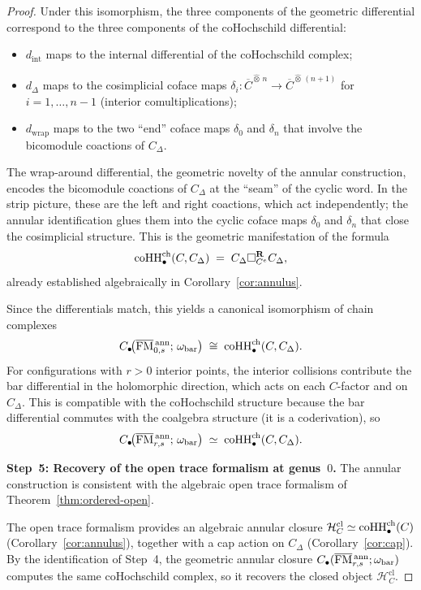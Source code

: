 \begin{proof}
Under this isomorphism, the three components of the geometric
differential correspond to the three components of the coHochschild
differential:
\begin{itemize}
\item $d_{\mathrm{int}}$ maps to the internal differential of
 the coHochschild complex;
\item $d_\Delta$ maps to the cosimplicial coface maps
 $\delta_i\colon \overline{C}^{\widehat\otimes\, n}
 \to \overline{C}^{\widehat\otimes\, (n+1)}$
 for $i = 1, \ldots, n-1$ (interior comultiplications);
\item $d_{\mathrm{wrap}}$ maps to the two ``end'' coface maps
 $\delta_0$ and $\delta_n$ that involve the bicomodule coactions
 of $C_\Delta$.
\end{itemize}
The wrap-around differential, the
geometric novelty of the annular construction, encodes
the bicomodule coactions of $C_\Delta$ at the ``seam'' of the
cyclic word. In the strip picture, these are the left and right
coactions, which act independently; the annular identification glues
them into the cyclic coface maps $\delta_0$ and $\delta_n$ that
close the cosimplicial structure. This is the geometric
manifestation of the formula
\[
\operatorname{coHH}^{\mathrm{ch}}_\bullet(C, C_\Delta)
\;=\;
C_\Delta \square_{C^e}^{\mathbf R} C_\Delta,
\]
already established algebraically in
Corollary~\ref{cor:annulus}.

Since the differentials match, this yields a canonical isomorphism of
chain complexes
\[
C_\bullet\!\bigl(
\overline{\mathrm{FM}}{}^{\,\mathrm{ann}}_{0,s};\,
\omega_{\mathrm{bar}}
\bigr)
\;\cong\;
\operatorname{coHH}^{\mathrm{ch}}_\bullet(C, C_\Delta).
\]
For configurations with $r > 0$ interior points, the interior
collisions contribute the bar differential in the holomorphic
direction, which acts on each $C$-factor and on $C_\Delta$. This
is compatible with the coHochschild structure because the bar
differential commutes with the coalgebra structure
(it is a coderivation), so
\[
C_\bullet\!\bigl(
\overline{\mathrm{FM}}{}^{\,\mathrm{ann}}_{r,s};\,
\omega_{\mathrm{bar}}
\bigr)
\;\simeq\;
\operatorname{coHH}^{\mathrm{ch}}_\bullet(C, C_\Delta).
\]

\medskip\noindent
\textbf{Step~5: Recovery of the open trace formalism at genus~$0$.}
The annular construction is consistent with the algebraic open trace
formalism of Theorem~\ref{thm:ordered-open}.

The open trace formalism provides an algebraic annular closure
$\mathcal H_C^{\mathrm{cl}} \simeq \operatorname{coHH}^{\mathrm{ch}}_\bullet(C)$
(Corollary~\ref{cor:annulus}), together with a cap action on
$C_\Delta$ (Corollary~\ref{cor:cap}). By the identification of
Step~4, the geometric annular closure
$C_\bullet(\overline{\mathrm{FM}}{}^{\,\mathrm{ann}}_{r,s};\omega_{\mathrm{bar}})$
computes the same coHochschild complex, so it recovers the closed
object $\mathcal H_C^{\mathrm{cl}}$.


\end{proof}

